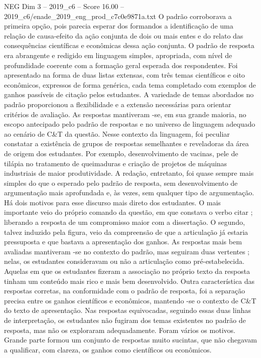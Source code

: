 \begin{textsample}{NEG Dim 3 – 2019\_c6 – Score 16.00 – 2019\_c6/enade\_2019\_eng\_prod\_c7c0e9871a.txt}
O padrão corroborava a primeira opção, pois parecia esperar dos formandos a identificação de uma relação de causa-efeito da ação conjunta de dois ou mais entes e do relato das consequências científicas e econômicas dessa ação conjunta.
O padrão de resposta era abrangente e redigido em linguagem simples, apropriada, com nível de profundidade coerente com a formação geral esperada dos respondentes.
Foi apresentado na forma de duas listas extensas, com três temas científicos e oito econômicos, expressos de forma genérica, cada tema completado com exemplos de ganhos passíveis de citação pelos estudantes.
A variedade de temas abordados no padrão proporcionou a flexibilidade e a extensão necessárias para orientar critérios de avaliação.
As respostas mantiveram -se, em sua grande maioria, no escopo antecipado pelo padrão de respostas e no universo de linguagem adequado ao cenário de C\&T da questão.
Nesse contexto da linguagem, foi peculiar constatar a existência de grupos de respostas semelhantes e reveladoras da área de origem dos estudantes.
Por exemplo, desenvolvimento de vacinas, pele de tilápia no tratamento de queimaduras e criação de projetos de máquinas industriais de maior produtividade.
A redação, entretanto, foi quase sempre mais simples do que o esperado pelo padrão de resposta, sem desenvolvimento de argumentação mais aprofundada e, às vezes, sem qualquer tipo de argumentação.
Há dois motivos para esse discurso mais direto dos estudantes.
O mais importante veio do próprio comando da questão, em que constava o verbo citar ; liberando a resposta de um compromisso maior com a dissertação.
O segundo, talvez induzido pela figura, veio da compreensão de que a articulação já estaria pressuposta e que bastava a apresentação dos ganhos.
As respostas mais bem avaliadas mantiveram -se no contexto do padrão, mas seguiram duas vertentes ; nelas, os estudantes consideravam ou não a articulação como pré-estabelecida.
Aquelas em que os estudantes fizeram a associação no próprio texto da resposta tinham um conteúdo mais rico e mais bem desenvolvido.
Outra característica das respostas corretas, na conformidade com o padrão de resposta, foi a separação precisa entre os ganhos científicos e econômicos, mantendo -se o contexto de C\&T do texto de apresentação.
Nas respostas equivocadas, seguindo essas duas linhas de interpretação, os estudantes não fugiram dos temas existentes no padrão de resposta, mas não os exploraram adequadamente.
Foram vários os motivos.
Grande parte formou um conjunto de respostas muito sucintas, que não chegavam a qualificar, com clareza, os ganhos como científicos ou econômicos.

\end{textsample}
